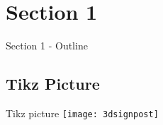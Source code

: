 \documentclass[../main/main.tex]{subfiles}
\begin{document}
\onlyinsubfile{%

}

\section{Section 1}%
\label{sec:modelisation}

\begin{frame}{Section 1 - Outline}
\end{frame}

\subsection{Tikz Picture}

\begin{frame}{Tikz picture}
    \centering
    \texttt{[image: 3dsignpost]}
\end{frame}
\end{document}
